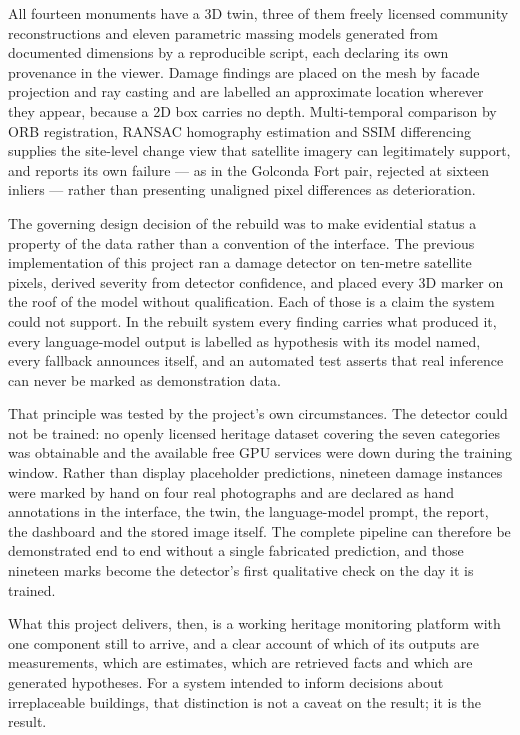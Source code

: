 \documentclass[a4paper,12pt,oneside]{book}
\begin{document}
All fourteen monuments have a 3D twin, three of them freely licensed community reconstructions and eleven parametric massing models generated from documented dimensions by a reproducible script, each declaring its own provenance in the viewer. Damage findings are placed on the mesh by facade projection and ray casting and are labelled an approximate location wherever they appear, because a 2D box carries no depth. Multi-temporal comparison by ORB registration, RANSAC homography estimation and SSIM differencing supplies the site-level change view that satellite imagery can legitimately support, and reports its own failure --- as in the Golconda Fort pair, rejected at sixteen inliers --- rather than presenting unaligned pixel differences as deterioration.

The governing design decision of the rebuild was to make evidential status a property of the data rather than a convention of the interface. The previous implementation of this project ran a damage detector on ten-metre satellite pixels, derived severity from detector confidence, and placed every 3D marker on the roof of the model without qualification. Each of those is a claim the system could not support. In the rebuilt system every finding carries what produced it, every language-model output is labelled as hypothesis with its model named, every fallback announces itself, and an automated test asserts that real inference can never be marked as demonstration data.

That principle was tested by the project's own circumstances. The detector could not be trained: no openly licensed heritage dataset covering the seven categories was obtainable and the available free GPU services were down during the training window. Rather than display placeholder predictions, nineteen damage instances were marked by hand on four real photographs and are declared as hand annotations in the interface, the twin, the language-model prompt, the report, the dashboard and the stored image itself. The complete pipeline can therefore be demonstrated end to end without a single fabricated prediction, and those nineteen marks become the detector's first qualitative check on the day it is trained.

What this project delivers, then, is a working heritage monitoring platform with one component still to arrive, and a clear account of which of its outputs are measurements, which are estimates, which are retrieved facts and which are generated hypotheses. For a system intended to inform decisions about irreplaceable buildings, that distinction is not a caveat on the result; it is the result.
\end{document}
